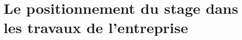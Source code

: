 \documentclass[a4paper, 11pt, french]{report}
\begin{document}
                                                                                                                                                                                                                                       \section{Le
                                                                                                                                                                                                                                       positionnement
                                                                                                                                                                                                                                       du
                                                                                                                                                                                                                                       stage
                                                                                                                                                                                                                                       dans
                                                                                                                                                                                                                                       les
                                                                                                                                                                                                                                       travaux
                                                                                                                                                                                                                                       de
                                                                                                                                                                                                                                       l'entreprise}
                                                                                                                                                                                                                                         
\end{document}

